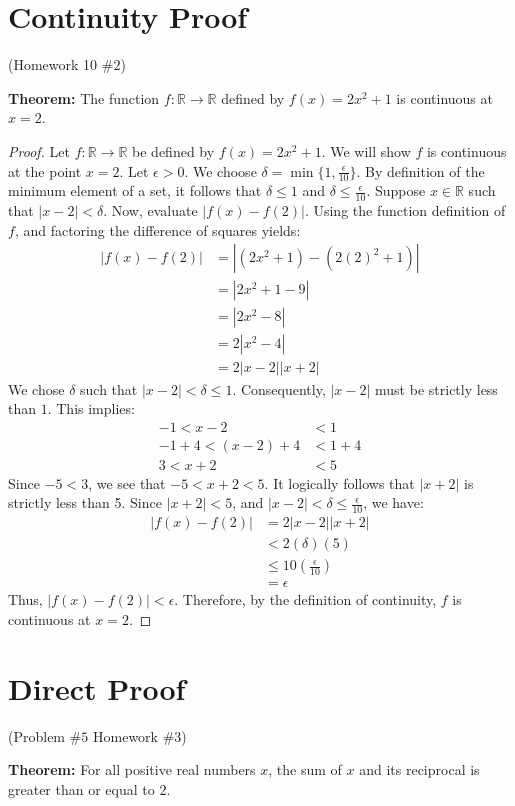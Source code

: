 \documentclass[12pt]{amsart}
\begin{document}
\section{Continuity Proof}
\begin{center}(Homework 10 $\#2$)\end{center}

\textbf{Theorem:} The function $f: \mathbb{R} \rightarrow \mathbb{R}$ defined by $f(x) = 2x^2+1$ is continuous at $x=2$.

\begin{proof}
Let $f: \mathbb{R} \rightarrow \mathbb{R}$ be defined by $f(x)=2x^2+1$. We will show $f$ is continuous at the point $x=2$. Let $\epsilon > 0$. We choose $\delta = \min\{1, \frac{\epsilon}{10}\}$. By definition of the minimum element of a set, it follows that $\delta \le 1$ and $\delta \le \frac{\epsilon}{10}$. Suppose $x \in \mathbb{R}$ such that $|x-2| < \delta$. 
Now, evaluate $|f(x)-f(2)|$. Using the function definition of $f$, and factoring the difference of squares yields:
\begin{align*}
    |f(x) - f(2)| &= |(2x^2+1) - (2(2)^2+1)| \\
    &= |2x^2+1-9| \\
    &= |2x^2-8| \\
    &= 2|x^2-4| \\
    &= 2|x-2||x+2| 
\end{align*}
We chose $\delta$ such that $|x-2| < \delta \le 1$. Consequently, $|x-2|$ must be strictly less than $1$. This implies:
\begin{align*}
    -1 < x - 2 &< 1\\
    -1+4 < (x - 2)+4 &< 1 + 4\\
     3 < x + 2 &< 5
\end{align*}
Since $-5 < 3$, we see that $-5<x+2<5$. It logically follows that $|x+2|$ is strictly less than 5. Since $|x+2| < 5$, and $|x-2| < \delta \le \frac{\epsilon}{10}$, we have:
\begin{align*}
|f(x) - f(2)| &= 2|x-2||x+2|\\
    &< 2 (\delta) (5) \\
    &\le 10 \left(\frac{\epsilon}{10}\right) \\
    &= \epsilon
\end{align*}
Thus, $|f(x) - f(2)| < \epsilon$. Therefore, by the definition of continuity, $f$ is continuous at $x=2$.
\end{proof}

\newpage
\section{Direct Proof}
\begin{center}(Problem $\#5$ Homework $\#3$)\end{center}
\noindent\textbf{Theorem:} For all positive real numbers $x$, the sum of $x$ and its reciprocal is greater than or equal to $2$.
\end{document}
